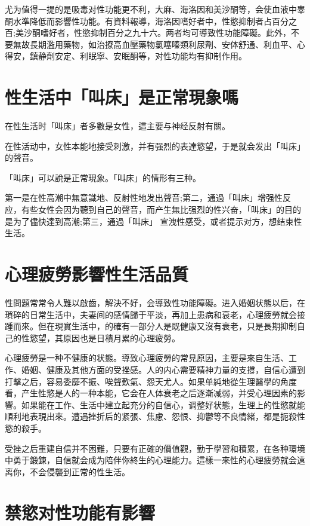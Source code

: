 \documentclass[12pt,UTF8]{ctexbook}
\begin{document}
尤为值得一提的是吸毒对性功能更不利，大麻、海洛因和美沙酮等，会使血液中睾酮水準降低而影響性功能。有資料報導，海洛因嗜好者中，性慾抑制者占百分之百;美沙酮嗜好者，性慾抑制百分之九十六。两者均可導致性功能障礙。此外，不要無故長期濫用藥物，如治撩高血壓藥物氯噻嗪類利尿劑、安体舒通、利血平、心得安，鎮静劑安定、利眠寧、安眠酮等，对性功能均有抑制作用。

\section{性生活中「叫床」是正常現象嗎}

在性生活时「叫床」者多數是女性，這主要与神经反射有關。

在性活动中，女性本能地接受刺激，并有强烈的表達慾望，于是就会发出「叫床」的聲音。

「叫床」可以說是正常現象。「叫床」的情形有三种。

第一是在性高潮中無意識地、反射性地发出聲音;第二，通過「叫床」增强性反应，有些女性会因为聽到自己的聲音，而产生無比强烈的性兴奋，「叫床」的目的是为了儘快達到高潮;第三，通過「叫床」
宣洩性感受，或者提示对方，想结束性生活。

\section{心理疲勞影響性生活品質}

性問題常常令人難以啟齒，解決不好，会導致性功能障礙。进入婚姻状態以后，在瑣碎的日常生活中，夫妻间的感情歸于平淡，再加上患病和衰老，心理疲勞就会接踵而來。但在現實生活中，的確有一部分人是既健康又沒有衰老，只是長期抑制自己的性慾望，其原因也是日積月累的心理疲勞。

心理疲勞是一种不健康的状態。導致心理疲勞的常見原因，主要是來自生活、工作、婚姻、健康及其他方面的受挫感。人的内心需要精神力量的支撐，自信心遭到打擊之后，容易委靡不振、唉聲歎氣、怨天尤人。如果单純地從生理醫學的角度看，产生性慾是人的一种本能，它会在人体衰老之后逐漸减弱，并受心理因素的影響。如果能在工作、生活中建立起充分的自信心，调整好状態，生理上的性慾就能順利地表現出來。遭遇挫折后的紧張、焦慮、怨恨、抑鬱等不良情緒，都是扼殺性慾的殺手。

受挫之后重建自信并不困難，只要有正確的價值觀，勤于學習和積累，在各种環境中勇于鍛鍊，自信就会成为陪伴你終生的心理能力。這樣一來性的心理疲勞就会遠离你，不会侵襲到正常的性生活。

\section{禁慾对性功能有影響}
\end{document}
